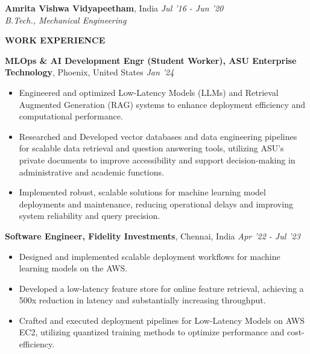 \documentclass[10pt,a4]{article}
\def\hrulefill{\leavevmode\leaders\hrule height 1pt\hfill\kern 0pt}		%
\begin{document}
{\begin{flushleft}

    
    \textbf{\large Amrita Vishwa Vidyapeetham}, \large India \tab  \hfill \textit{\large Jul '16 - Jun '20}	\\
        \hspace{0.5 cm}\textit{\large B.Tech., Mechanical Engineering}

\end{flushleft}
		
		
		
\begin{flushleft}
      {\Large \textbf{WORK EXPERIENCE}} %
  
        \vspace{1.5mm}
        \textbf{\large MLOps \& AI Development Engr (Student Worker), ASU Enterprise Technology},  \large Phoenix, United States \hfill \textit{\large Jan '24}	\\
        \begin{itemize}
            \item Engineered and optimized Low-Latency Models (LLMs) and Retrieval Augmented Generation (RAG) systems to enhance deployment efficiency and computational performance.
            \item Researched and Developed vector databases and data engineering pipelines for scalable data retrieval and question answering tools, utilizing ASU’s private documents to improve accessibility and support decision-making in administrative and academic functions.
            \item Implemented robust, scalable solutions for machine learning model deployments and maintenance, reducing operational delays and improving system reliability and query precision.
        \end{itemize}	

        \vspace{0.5mm}
        \textbf{\large Software Engineer, Fidelity Investments},  \large Chennai, India \hfill \textit{\large Apr '22 - Jul '23}	\\
        \begin{itemize}
            \item Designed and implemented scalable deployment workflows for machine learning models on the AWS.  
            \item Developed a low-latency feature store for online feature retrieval, achieving a 500x reduction in latency and substantially increasing throughput.
            \item Crafted and executed deployment pipelines for Low-Latency Models on AWS EC2, utilizing quantized training methods to optimize performance and cost-efficiency. 
        \end{itemize}	
  

\end{flushleft}}
\end{document}
